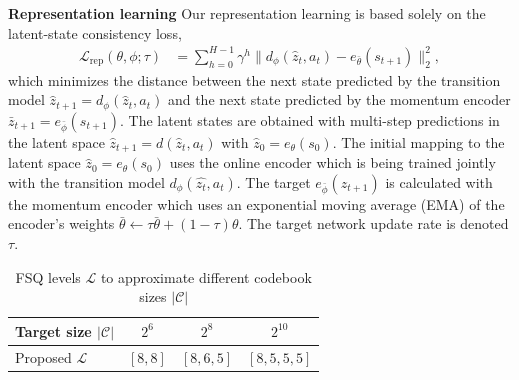 \documentclass{article}
\theoremstyle{plain}
\theoremstyle{definition}
\theoremstyle{remark}
\newcommand{\E}{\mathbb{E}}
\begin{document}
\textbf{Representation learning}
Our representation learning is based solely on the latent-state consistency loss,
%
\begin{align} \label{eq:rep-loss}
  \mathcal{L}_{\text{rep}}(\theta, \phi; \tau)
&= \sum_{h=0}^{H-1} \gamma^{h} \| d_{\phi}(\hat{z}_{t}, a_{t}) - e_{\bar{\theta}}(s_{t+1}) \|_{2}^{2},
\end{align}
%
which minimizes the distance between the next state predicted by the transition model $\hat{z}_{t+1} = d_{\phi}(\hat{z}_{t}, a_{t})$
and the next state predicted by the momentum encoder $\bar{z}_{t+1} = e_{\bar{\phi}}(s_{t+1})$.
The latent states are obtained with multi-step predictions in the latent space $\hat{z}_{t+1} = d(\hat{z}_{t}, a_{t})$
with $\hat{z}_{0} = e_{\theta}(s_{0})$.
The initial mapping to the latent space $\hat{z}_{0} = e_{\theta}(s_{0})$ uses the online encoder which
is being trained jointly with the transition model $d_{\phi}(\hat{z_{t}}, a_{t})$.
The target $e_{\bar{\phi}}(z_{t+1})$ is calculated with the momentum encoder which uses an exponential moving average (EMA)
of the encoder's weights $\bar{\theta} \leftarrow \tau \bar{\theta} + (1-\tau)\theta$.
The target network update rate is denoted $\tau$.

\begin{table}[t]
\caption{FSQ levels $\mathcal{L}$ to approximate different codebook sizes $|\mathcal{C}|$}
\label{tab:fsq-levels}
\vskip 0.15in
\begin{center}
\begin{small}
\begin{sc}
\begin{tabular}{lccc}
\toprule
Target size $|\mathcal{C}|$ & $2^{6}$ & $2^{8}$ & $2^{10}$ \\
\midrule
Proposed $\mathcal{L}$ & $[8,8]$ & $[8,6,5]$ & $[8,5,5,5]$ \\
\bottomrule
\end{tabular}
\end{sc}
\end{small}
\end{center}
\vskip -0.1in
\end{table}
\end{document}

